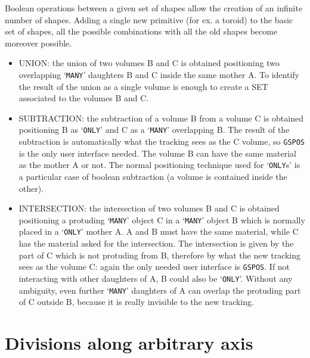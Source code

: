 Boolean operations between a given set of shapes allow the creation of an
infinite number of shapes. Adding a single new primitive (for ex. a toroid) to 
the basic set of shapes, all the possible combinations with all the old shapes
become moreover possible.\\[.5cm]
\begin{itemize}
\item UNION: the union of two volumes B and C is obtained positioning two
             overlapping `{\tt MANY}' daughters B and C inside the same mother
             A.
             To identify the result of the union as a single volume is enough
             to create a SET associated to the volumes B and C. 
\item SUBTRACTION: the subtraction of a volume B from a volume C is obtained
                   positioning B as `{\tt ONLY}' and C as a `{\tt MANY}' 
                   overlapping B.
                   The result of the subtraction is automatically what the
                   tracking sees as the C volume, so {\tt GSPOS} is the only 
                   user
                   interface needed. The volume B can have the same material as
                   the mother A or not. The normal positioning technique used
                   for `{\tt ONLY}s' is a particular case of boolean subtraction (a
                   volume is contained inside the other).
\item INTERSECTION: the intersection of two volumes B and C is obtained 
                    positioning a protuding `{\tt MANY}' object C in 
                    a `{\tt MANY}' object
                    B which is normally placed in a `{\tt ONLY}' mother A. A and B
                    must have the same material, while C has the material asked
                    for the intersection. The intersection is given by the part
                    of C which is not protuding from B, therefore by what the
                    new tracking sees as the volume C: again the only needed
                    user interface is {\tt GSPOS}. If not interacting with other
                    daughters of A, B could also be `{\tt ONLY}'. Without any
                    ambiguity, even further `{\tt MANY}' daughters of A can overlap
                    the protuding part of C outside B, because it is really
                    invisible to the new tracking. 
\end{itemize}
 
\section{Divisions along arbitrary axis}

